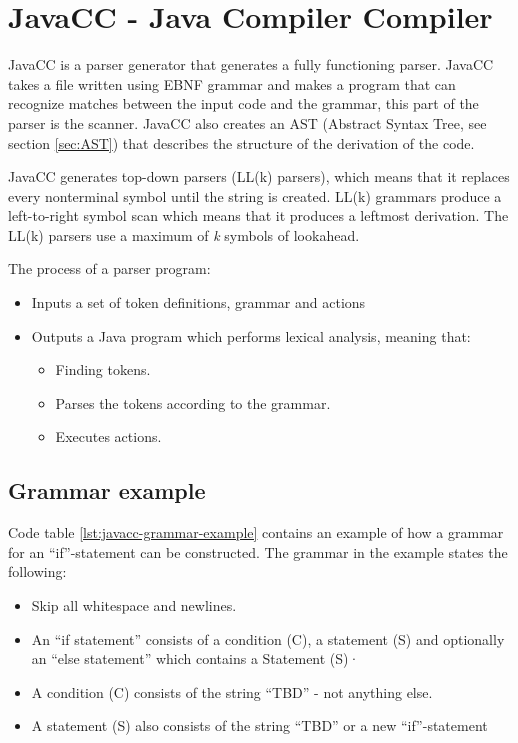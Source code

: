 \chapter{JavaCC - Java Compiler Compiler}
JavaCC is a parser generator that generates a fully functioning parser. JavaCC takes a file written using EBNF grammar and makes a program that can recognize matches between the input code and the grammar, this part of the parser is the scanner. JavaCC also creates an AST (Abstract Syntax Tree, see section \ref{sec:AST}) that describes the structure of the derivation of the code. \cite{JavaCC}

JavaCC generates top-down parsers (LL(k) parsers), which means that it replaces every nonterminal symbol until the string is created. LL(k) grammars produce a left-to-right symbol scan which means that it produces a leftmost derivation. The LL(k) parsers use a maximum of \textit{k} symbols of lookahead.

The process of a parser program:
\begin{itemize}
\item Inputs a set of token definitions, grammar and actions
\item Outputs a Java program which performs lexical analysis, meaning that:
	\begin{itemize}
	\item Finding tokens.
	\item Parses the tokens according to the grammar.
	\item Executes actions.
	\end{itemize}
\end{itemize}


\section{Grammar example}
Code table \ref{lst:javacc-grammar-example} contains an example of how a grammar for an ``if''-statement can be constructed. The grammar in the example states the following:

\begin{itemize}
	\item Skip all whitespace and newlines.
	\item An ``if statement'' consists of a condition (C), a statement (S)  and optionally an ``else statement'' which contains a Statement (S)·
	\item A condition (C) consists of the string ``TBD'' - not anything else.
	\item A statement (S) also consists of the string ``TBD'' or a new ``if''-statement
\end{itemize}

